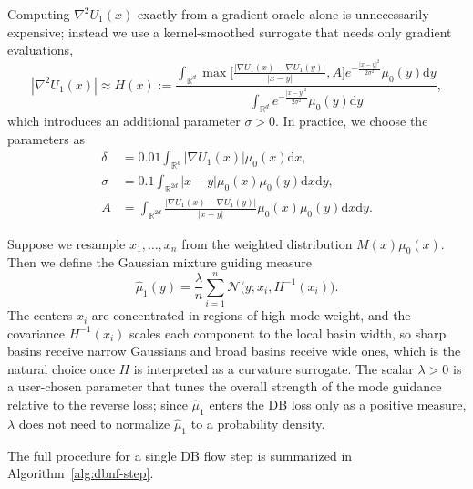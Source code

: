 \documentclass{article}
\newcommand{\D}{\mathrm{d}}
\theoremstyle{plain}
\begin{document}
Computing $\nabla^2 U_1(x)$ exactly from a gradient oracle alone is unnecessarily expensive; instead we use a kernel-smoothed surrogate that needs only gradient evaluations,
\begin{equation}
    |\nabla^2 U_1(x)| \approx H(x) := \frac{\displaystyle \int_{\mathbb R^d} \max\biggl[\frac{|\nabla U_1(x) - \nabla U_1(y)|}{|x-y|}, A\biggr] e^{-\frac{|x-y|^2}{2\sigma^2}} \mu_0(y) \D y}{\displaystyle \int_{\mathbb R^d} e^{-\frac{|x-y|^2}{2\sigma^2}} \mu_0(y) \D y},
\end{equation}
which introduces an additional parameter $\sigma>0$. In practice, we choose the parameters as
\begin{subequations}\label{eq:dsa-params}
\begin{align}
    \delta &= 0.01 \int_{\mathbb R^d} |\nabla U_1(x)| \mu_0(x) \D x, \label{eq:param-delta}\\
    \sigma &= 0.1 \int_{\mathbb R^{2d}} |x-y| \mu_0(x) \mu_0(y) \D x \D y, \label{eq:param-sigma}\\
    A &= \int_{\mathbb R^{2d}} \frac{|\nabla U_1(x) - \nabla U_1(y)|}{|x-y|} \mu_0(x) \mu_0(y) \D x \D y. \label{eq:param-A}
\end{align}
\end{subequations}

Suppose we resample $x_1,\dots,x_n$ from the weighted distribution $M(x) \mu_0(x)$. Then we define the Gaussian mixture guiding measure
\begin{equation}
    \hat\mu_1(y) = \frac{\lambda}n \sum_{i=1}^n \mathcal N\bigl(y;x_i,H^{-1}(x_i)\bigr).
\end{equation}
The centers $x_i$ are concentrated in regions of high mode weight, and the covariance $H^{-1}(x_i)$ scales each component to the local basin width, so sharp basins receive narrow Gaussians and broad basins receive wide ones, which is the natural choice once $H$ is interpreted as a curvature surrogate. The scalar $\lambda > 0$ is a user-chosen parameter that tunes the overall strength of the mode guidance relative to the reverse loss; since $\hat\mu_1$ enters the DB loss only as a positive measure, $\lambda$ does not need to normalize $\hat\mu_1$ to a probability density.

The full procedure for a single DB flow step is summarized in Algorithm~\ref{alg:dbnf-step}.
\end{document}
